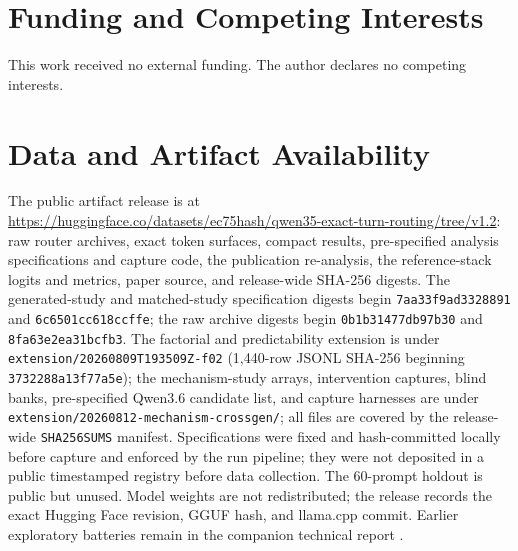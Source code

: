 \documentclass[10pt,a4paper,twocolumn]{article}
\begin{document}
\section*{Funding and Competing Interests}

This work received no external funding. The author declares no competing
interests.

\section*{Data and Artifact Availability}

The public artifact release is at
\url{https://huggingface.co/datasets/ec75hash/qwen35-exact-turn-routing/tree/v1.2}:
raw router archives, exact token surfaces, compact results, pre-specified
analysis specifications and capture code, the publication re-analysis, the
reference-stack logits and metrics, paper source, and release-wide SHA-256
digests. The generated-study and matched-study specification digests begin
\texttt{7aa33f9ad3328891} and \texttt{6c6501cc618ccffe}; the raw archive
digests begin \texttt{0b1b31477db97b30} and \texttt{8fa63e2ea31bcfb3}. The
factorial and predictability extension is under
\texttt{extension/20260809T193509Z-f02} (1,440-row JSONL SHA-256 beginning
\texttt{3732288a13f77a5e}); the mechanism-study arrays, intervention captures,
blind banks, pre-specified Qwen3.6 candidate list, and capture harnesses are
under \texttt{extension/20260812-mechanism-crossgen/}; all files are covered by
the release-wide \texttt{SHA256SUMS} manifest. Specifications were fixed and
hash-committed locally before capture and enforced by the run pipeline; they
were not deposited in a public timestamped registry before data collection.
The 60-prompt holdout is public but unused. Model weights are not
redistributed; the release records the exact Hugging Face revision, GGUF hash,
and llama.cpp commit. Earlier exploratory batteries remain in the companion
technical report \cite{shorthill2026}.
\end{document}
